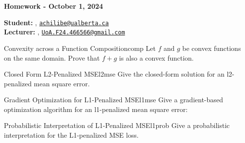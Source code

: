 





\begin{Large}
    \textsf{\textbf{Homework - October 1, 2024}}
\end{Large}

\vspace{1ex}

\textsf{\textbf{Student:}} , \href{mailto:achilibe@ualberta.ca}{\texttt{achilibe@ualberta.ca}}\\
\textsf{\textbf{Lecturer:}} , \href{mailto:UoA.F24.466566@gmail.com}{\texttt{UoA.F24.466566@gmail.com}}


\vspace{2ex}


\begin{problem}{Convexity across a Function Composition}{comp}
Let $f$ and $g$ be convex functions on the same domain. Prove that $f+g$ is also a convex function.
\end{problem}



\begin{problem}{Closed Form L2-Penalized MSE}{l2mse}
Give the closed-form solution for an l2-penalized mean square error.
\end{problem}



\begin{problem}{Gradient Optimization for L1-Penalized MSE}{l1mse}
Give a gradient-based optimization algorithm for an l1-penalized mean square error:
\end{problem}



\pagebreak

\begin{problem}{Probabilistic Interpretation of L1-Penalized MSE}{l1prob}
Give a probabilistic interpretation for the L1-penalized MSE loss.
\end{problem}










